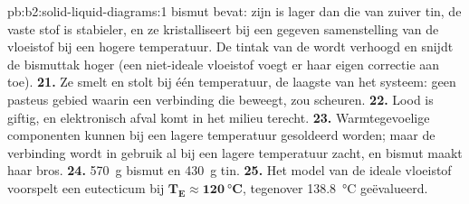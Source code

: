 \begin{solution}{pb:b2:solid-liquid-diagrams:1}
bismut bevat: zijn  is lager dan die van zuiver tin, de vaste stof is
stabieler, en ze kristalliseert bij een gegeven samenstelling van de vloeistof bij een hogere
temperatuur. De tintak van de  wordt verhoogd en snijdt de bismuttak
hoger (een niet-ideale vloeistof voegt er haar eigen correctie aan toe).
\textbf{21.} Ze smelt en stolt bij één temperatuur, de laagste van het systeem:
geen pasteus gebied waarin een verbinding die beweegt, zou scheuren.
\textbf{22.} Lood is giftig, en elektronisch afval komt in het milieu terecht.
\textbf{23.} Warmtegevoelige componenten kunnen bij een lagere temperatuur gesoldeerd worden;
maar de verbinding wordt in gebruik al bij een lagere temperatuur zacht, en bismut maakt haar
bros.
\textbf{24.} \qty{570}{g} bismut en \qty{430}{g} tin.
\textbf{25.} Het model van de ideale vloeistof voorspelt een eutecticum bij $\boldsymbol{T_E
\approx \qty{120}{\degreeCelsius}}$, tegenover \qty{138.8}{\degreeCelsius}
geëvalueerd.
\end{solution}
